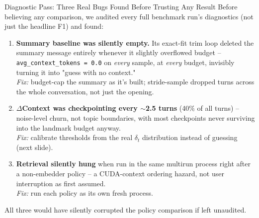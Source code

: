 \documentclass[aspectratio=169]{beamer}
\begin{document}
\begin{frame}{Diagnostic Pass: Three Real Bugs Found Before Trusting Any Result}
    Before believing any comparison, we audited every full benchmark run's diagnostics (not just the headline F1) and found:
    \begin{enumerate}
        \item \textbf{Summary baseline was silently empty.} Its exact-fit trim loop deleted the summary message entirely whenever it slightly overflowed budget -- \texttt{avg\_context\_tokens = 0.0} on \emph{every} sample, at \emph{every} budget, invisibly turning it into "guess with no context." \\
        \emph{Fix:} budget-cap the summary as it's built; stride-sample dropped turns across the whole conversation, not just the opening.
        \item \textbf{$\Delta$Context was checkpointing every $\sim$2.5 turns} (40\% of all turns) -- noise-level churn, not topic boundaries, with most checkpoints never surviving into the landmark budget anyway. \\
        \emph{Fix:} calibrate thresholds from the real $\delta_t$ distribution instead of guessing (next slide).
        \item \textbf{Retrieval silently hung} when run in the same multirun process right after a non-embedder policy -- a CUDA-context ordering hazard, not user interruption as first assumed. \\
        \emph{Fix:} run each policy as its own fresh process.
    \end{enumerate}
    \small All three would have silently corrupted the policy comparison if left unaudited.
\end{frame}
\end{document}
